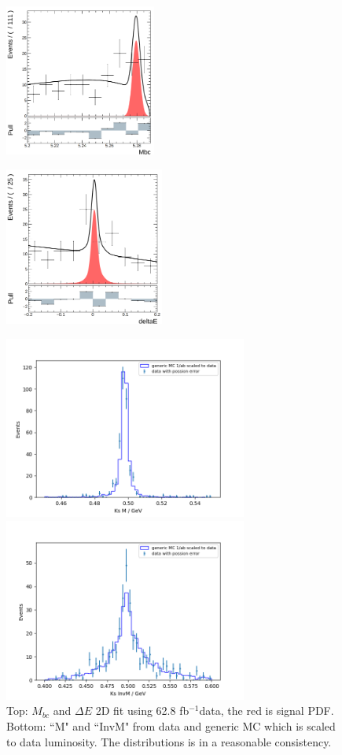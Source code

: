 \begin{figure}[H]
	\begin{minipage}[b]{0.5\linewidth}
		\centering 
		\includegraphics[height=5cm]{figures/mbc-hist-2d-data}
		\label{}
	\end{minipage}
	\begin{minipage}[b]{0.5\linewidth}
		\centering 
		\includegraphics[height=5.2cm]{figures/dE-hist-2d-data}
		\label{}
	\end{minipage}
\begin{minipage}[b]{0.5\linewidth}
	\centering 
	\includegraphics[height=6cm]{figures/best_KsM}	
\end{minipage}
\begin{minipage}[b]{0.5\linewidth}
	\centering 
	\includegraphics[height=6cm]{figures/best_KsInvM}	
\end{minipage}
\caption{Top: $M_{bc}$ and $\Delta E$ 2D fit using 62.8 fb$^{-1}$data, the red is signal PDF.
	Bottom: ``M" and ``InvM" from data and generic MC which is scaled to data luminosity. The distributions is in a reasonable consistency. }
\end{figure}
